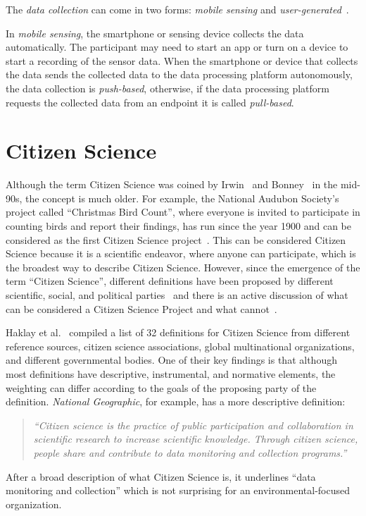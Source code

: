 The \textit{data collection} can come in two forms: \textit{mobile sensing} and \textit{user-generated}~\cite{pietschmann2008croco}.

In \textit{mobile sensing}, the smartphone or sensing device collects the data automatically.
The participant may need to start an app or turn on a device to start a recording of the sensor data.
When the smartphone or device that collects the data sends the collected data to the data processing platform autonomously, the data collection is \textit{push-based}, otherwise, if the data processing platform requests the collected data from an endpoint it is called \textit{pull-based}. 

\section{Citizen Science}
\label{sec:citizen_science_background}
Although the term Citizen Science was coined by Irwin~\cite{irwin2002citizen} and Bonney~\cite{bonney1996citizen} in the mid-90s, the concept is much older.
For example, the National Audubon Society's project called ``Christmas Bird Count'', where everyone is invited to participate in counting birds and report their findings, has run since the year 1900 and can be considered as the first Citizen Science project~\cite{silvertown2009new}.
This can be considered Citizen Science because it is a scientific endeavor, where anyone can participate, which is the broadest way to describe Citizen Science.
However, since the emergence of the term ``Citizen Science'', different definitions have been proposed by different scientific, social, and political parties~\cite{heigl2019toward,ecsa2015ten,us2016crowdsourcing} and there is an active discussion of what can be considered a Citizen Science Project and what cannot~\cite{haklay2021citizen}. 

Haklay et al.~\cite{haklay2021citizen} compiled a list of 32 definitions for Citizen Science from different reference sources, citizen science associations, global multinational organizations, and different governmental bodies.
One of their key findings is that although most definitions have descriptive, instrumental, and normative elements, the weighting can differ according to the goals of the proposing party of the definition.
\textit{National Geographic}, for example, has a more descriptive definition:
\begin{quotation}
\textit{``Citizen science is the practice of public participation and collaboration in scientific research to increase scientific knowledge. Through citizen science, people share and contribute to data monitoring and collection programs.''~\cite{ullrich2024citizen}}
\end{quotation}
After a broad description of what Citizen Science is, it underlines ``data monitoring and collection'' which is not surprising for an environmental-focused organization.

